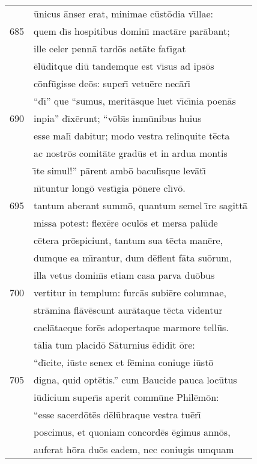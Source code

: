 \documentclass[paper=6in:9in,pagesize=pdftex,
               headinclude=on,footinclude=on,12pt]{scrbook}
\begin{document}
\begin{longtable}[p]{ r l }
 & \=unicus \=anser erat, minimae c\=ust\=odia v\={\i}llae:\\ 
685 & quem d\={\i}s hospitibus domin\={\i} mact\=are par\=abant;\\ 
 & ille celer penn\=a tard\=os aet\=ate fat\={\i}gat\\ 
 & \=el\=uditque di\=u tandemque est v\={\i}sus ad ips\=os\\ 
 & c\=onf\=ugisse de\=os: super\={\i} vetu\=ere nec\=ar\={\i}\\ 
 & ``d\={\i}'' que ``sumus, merit\=asque luet v\={\i}c\={\i}nia poen\=as\\ 
690 & inpia'' d\={\i}x\=erunt; ``v\=ob\={\i}s inm\=unibus huius\\ 
 & esse mal\={\i} dabitur; modo vestra relinquite t\=ecta\\ 
 & ac nostr\=os comit\=ate grad\=us et in ardua montis\\ 
 & \={\i}te simul!'' p\=arent amb\=o bacul\={\i}sque lev\=at\={\i}\\ 
 & n\={\i}tuntur long\=o vest\={\i}gia p\=onere cl\={\i}v\=o.\\ 
695 & tantum aberant summ\=o, quantum semel \={\i}re sagitt\=a\\ 
 & missa potest: flex\=ere ocul\=os et mersa pal\=ude\\ 
 & c\=etera pr\=ospiciunt, tantum sua t\=ecta man\=ere,\\ 
 & dumque ea m\={\i}rantur, dum d\=eflent f\=ata su\=orum,\\ 
 & illa vetus domin\={\i}s etiam casa parva du\=obus\\ 
700 & vertitur in templum: furc\=as subi\=ere columnae,\\ 
 & str\=amina fl\=av\=escunt aur\=ataque t\=ecta videntur\\ 
 & cael\=ataeque for\=es adopertaque marmore tell\=us.\\ 
 & t\=alia tum placid\=o S\=aturnius \=edidit \=ore:\\ 
 & ``d\={\i}cite, i\=uste senex et f\=emina coniuge i\=ust\=o\\ 
705 & digna, quid opt\=etis.'' cum Baucide pauca loc\=utus\\ 
 & i\=udicium super\={\i}s aperit comm\=une Phil\=em\=on:\\ 
 & ``esse sacerd\=ot\=es d\=el\=ubraque vestra tu\=er\={\i}\\ 
 & poscimus, et quoniam concord\=es \=egimus ann\=os,\\ 
 & auferat h\=ora du\=os eadem, nec coniugis umquam\\ 

\end{longtable}
\end{document}

